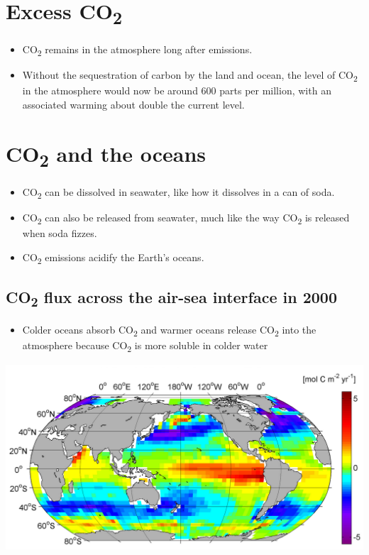 \documentclass[11pt]{article}
\begin{document}
\section{Excess CO\textsubscript{2}}
\label{sec:org9c26e1a}
\begin{itemize}
\item CO\textsubscript{2} remains in the atmosphere long after emissions.
\item Without the sequestration of carbon by the land and ocean, the level of CO\textsubscript{2} in the atmosphere would now be around 600 parts per million, with an associated warming about double the current level.
\end{itemize}
\section{CO\textsubscript{2} and the oceans}
\label{sec:orgca9a516}
\begin{itemize}
\item CO\textsubscript{2} can be dissolved in seawater, like how it dissolves in a can of soda.
\item CO\textsubscript{2} can also be released from seawater, much like the way CO\textsubscript{2} is released when soda fizzes.
\item CO\textsubscript{2} emissions acidify the Earth's oceans.
\end{itemize}
\subsection{CO\textsubscript{2} flux across the air-sea interface in 2000}
\label{sec:org14042ad}
\begin{itemize}
\item Colder oceans absorb CO\textsubscript{2} and warmer oceans release CO\textsubscript{2} into the atmosphere because CO\textsubscript{2} is more soluble in colder water
\end{itemize}
\begin{center}
\includegraphics[width=.9\linewidth]{./images/co-2-flux-map.png}
\end{center}
\end{document}
